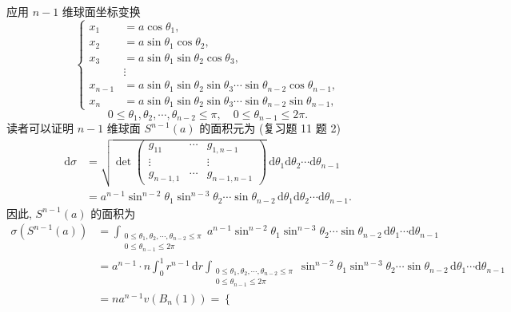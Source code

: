 \begin{solution}[解法 1]
应用 $n-1$ 维球面坐标变换
\[
  \left\{\begin{aligned}
    x_{1} &=a \cos \theta_{1}, \\
    x_{2} &=a \sin \theta_{1} \cos \theta_{2}, \\
    x_{3} &=a \sin \theta_{1} \sin \theta_{2} \cos \theta_{3}, \\
    & \vdots \\
    x_{n-1} &=a \sin \theta_{1} \sin \theta_{2} \sin \theta_{3} \cdots \sin \theta_{n-2} \cos \theta_{n-1}, \\
    x_{n} &=a \sin \theta_{1} \sin \theta_{2} \sin \theta_{3} \cdots \sin \theta_{n-2} \sin \theta_{n-1},
  \end{aligned}\right.
\]
\[
  0 \leqslant \theta_{1}, \theta_{2}, \cdots, \theta_{n-2} \leqslant \pi, \quad 0 \leqslant \theta_{n-1} \leqslant 2 \pi.
\]
读者可以证明 $n-1$ 维球面 $S^{n-1}(a)$ 的面积元为 (复习题 11 题 2)
\begin{align*}
  \mathrm{d} \sigma &=\sqrt{\operatorname{det}\begin{pmatrix}
      g_{11} & \cdots & g_{1, n-1} \\
      \vdots & & \vdots \\
      g_{n-1,1} & \cdots & g_{n-1, n-1}
    \end{pmatrix}}\,\mathrm{d} \theta_{1} \mathrm{d} \theta_{2} \cdots \mathrm{d} \theta_{n-1} \\
  &=a^{n-1} \sin ^{n-2} \theta_{1} \sin ^{n-3} \theta_{2} \cdots \sin \theta_{n-2}\,\mathrm{d} \theta_{1} \mathrm{d} \theta_{2} \cdots \mathrm{d} \theta_{n-1}.
\end{align*}
因此, $S^{n-1}(a)$ 的面积为
\begin{align*}
  \sigma\left(S^{n-1}(a)\right) &=\int_{\substack{0 \leqslant \theta_{1}, \theta_{2}, \cdots, \theta_{n-2} \leqslant \pi \\ 0 \leqslant \theta_{n-1} \leqslant 2 \pi}} a^{n-1} \sin ^{n-2} \theta_{1} \sin ^{n-3} \theta_{2} \cdots \sin \theta_{n-2}\,\mathrm{d} \theta_{1} \cdots \mathrm{d} \theta_{n-1} \\
  &=a^{n-1} \cdot n \int_{0}^{1} r^{n-1}\,\mathrm{d} r \int_{\substack{0 \leqslant \theta_{1}, \theta_{2}, \cdots, \theta_{n-2} \leqslant \pi \\ 0 \leqslant \theta_{n-1} \leqslant 2 \pi}} \sin ^{n-2} \theta_{1} \sin ^{n-3} \theta_{2} \cdots \sin \theta_{n-2}\,\mathrm{d} \theta_{1} \cdots \mathrm{d} \theta_{n-1} \\
  &=n a^{n-1} v\left(B_{n}(1)\right)=\left\{\begin{aligned}

\end{aligned}
\end{align*}
\end{solution}
